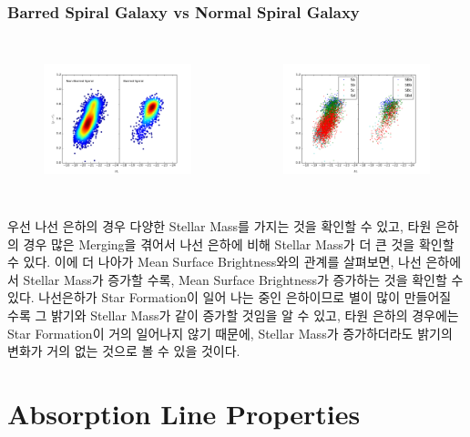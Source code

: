 \documentclass[xcolor={dvipsnames,table}]{beamer}
\newcommand\SSM{\fontsize{7}{7.2}\selectfont}
\begin{document}
\begin{frame}
 \frametitle{Barred Spiral Galaxy vs Normal Spiral Galaxy}
 \SSM
 \begin{columns}[t]
   \begin{figure}
    \centering
    \includegraphics[width=6cm, height=4cm]{colormagdensity2.png}
   \end{figure}
   \begin{figure}
    \centering
    \includegraphics[width=6cm, height=4cm]{what.png}
   \end{figure}
  \end{columns}
\vspace{0.3cm}
우선 나선 은하의 경우 다양한 Stellar Mass를 가지는 것을 확인할 수 있고, 타원 은하의 경우 많은 Merging을 겪어서 나선 은하에
비해 Stellar Mass가 더 큰 것을 확인할 수 있다. 이에 더 나아가 Mean Surface Brightness와의 관계를 살펴보면, 나선 은하에서
Stellar Mass가 증가할 수록, Mean Surface Brightness가 증가하는 것을 확인할 수 있다. 나선은하가 Star Formation이 일어
나는 중인 은하이므로 별이 많이 만들어질 수록 그 밝기와 Stellar Mass가 같이 증가할 것임을 알 수 있고, 타원 은하의 경우에는
Star Formation이 거의 일어나지 않기 때문에, Stellar Mass가 증가하더라도 밝기의 변화가 거의 없는 것으로 볼 수 있을 것이다.
\end{frame}

\section{Absorption Line Properties}
\end{document}
